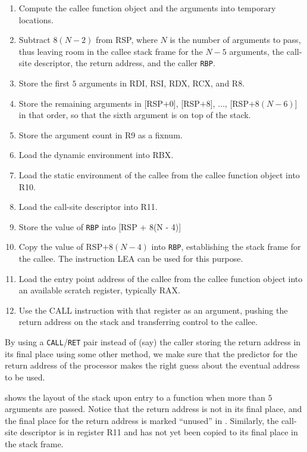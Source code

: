 \begin{enumerate}
\item Compute the callee function object and the arguments into
  temporary locations.
\item Subtract $8(N - 2)$ from RSP, where $N$ is the number of
  arguments to pass, thus leaving room in the callee stack frame for
  the $N - 5$ arguments, the call-site descriptor, the return address,
  and the caller \texttt{RBP}.
\item Store the first $5$ arguments in RDI, RSI, RDX, RCX, and R8.
\item Store the remaining arguments in [RSP$ + 0$], [RSP$ + 8$],
  $\ldots$, [RSP$ + 8(N - 6)$] in that order, so that the sixth
  argument is on top of the stack.
\item Store the argument count in R9 as a fixnum.
\item Load the dynamic environment into RBX.
\item Load the static environment of the callee from the callee
  function object into R10.
\item Load the call-site descriptor into R11.
\item Store the value of \texttt{RBP} into [RSP + 8(N - 4)]
\item Copy the value of RSP$ + 8(N - 4)$ into \texttt{RBP}, establishing the
  stack frame for the callee.  The instruction LEA can be used for
  this purpose.
\item Load the entry point address of the callee from the callee
  function object into an available scratch register, typically RAX.
\item Use the CALL instruction with that register as an argument,
  pushing the return address on the stack and transferring control to
  the callee.
\end{enumerate}

By using a \texttt{CALL}/\texttt{RET} pair instead of (say) the caller
storing the return address in its final place using some other method,
we make sure that the predictor for the return address of the
processor makes the right guess about the eventual address to be used.

 shows the layout of the stack
upon entry to a function when more than $5$ arguments are passed.
Notice that the return address is not in its final place, and the
final place for the return address is marked ``unused'' in
.  Similarly, the call-site
descriptor is in register R11 and has not yet been copied to its final
place in the stack frame.

